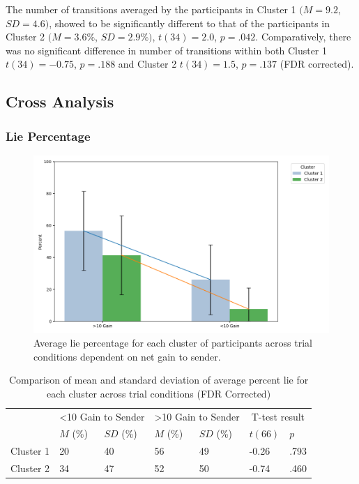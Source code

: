 \documentclass[man, floatsintext]{apa7}
\begin{document}
The number of transitions averaged by the participants in Cluster 1 $(M = 9.2$, $SD = 4.6)$, showed to be significantly different to that of the participants in Cluster 2 $(M = 3.6\%$, $SD = 2.9\%)$, $t(34)=2.0$, $p=.042$. Comparatively, there was no significant difference in number of transitions within both Cluster 1 $t(34)=-0.75$, $p=.188$ and Cluster 2 $t(34)=1.5$, $p=.137$ (FDR corrected).

\subsection{Cross Analysis}

\subsubsection{Lie Percentage}

 \begin{figure}[H]
	\includegraphics[width=\linewidth]{../plots/GainCluster/PercentLies.png}
	\caption{Average lie percentage for each cluster of participants across trial conditions dependent on net gain to sender.}
	\label{fig:PercentLiesPerGainByPIDCluster}
\end{figure}

\begin{table}[H]
	\centering
	\begin{tabular}{|c|p{1.5cm}|p{2cm}|p{1.5cm}|p{2cm}|p{2cm}|p{1.5cm}|}
		\hline
		\multirow{2}{*}{} & \multicolumn{2}{c|}{<10 Gain to Sender} & \multicolumn{2}{c|}{>10 Gain to Sender} & \multicolumn{2}{c|}{T-test result} \\ \cline{2-7}
		& $M$ (\%) &$SD$ (\%) & $M$ (\%) & $SD$ (\%) & $t(66)$ & $p$ \\ \hline
		Cluster 1& 20 & 40 & 56 & 49 & -0.26 & .793  \\ \hline
		Cluster 2 & 34 & 47 & 52 & 50 & -0.74 & .460  \\ \hline
	\end{tabular}
	\vspace{0.3cm}
	\caption{Comparison of mean and standard deviation of average percent lie for each cluster across trial conditions (FDR Corrected)}
	\label{tab:PercentLiesPerGainByPIDCluster}
\end{table}
\end{document}
